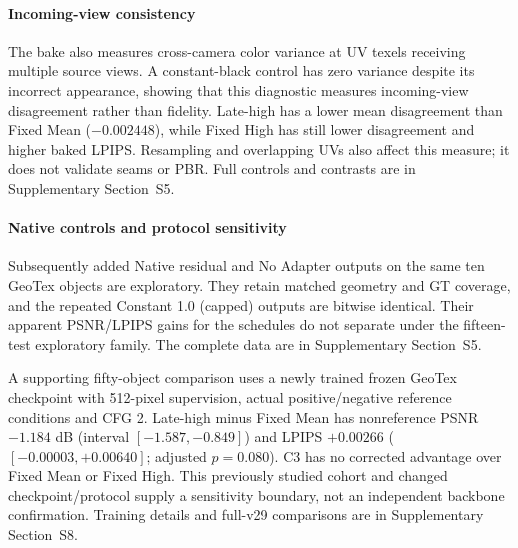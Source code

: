 \documentclass[times,twocolumn,final]{elsarticle}
\begin{document}
\paragraph{Incoming-view consistency}
The bake also measures cross-camera color variance at UV texels receiving multiple source views. A constant-black control has zero variance despite its incorrect appearance, showing that this diagnostic measures incoming-view disagreement rather than fidelity. Late-high has a lower mean disagreement than Fixed Mean ($-0.002448$), while Fixed High has still lower disagreement and higher baked LPIPS. Resampling and overlapping UVs also affect this measure; it does not validate seams or PBR. Full controls and contrasts are in Supplementary Section~S5.

\paragraph{Native controls and protocol sensitivity}
Subsequently added Native residual and No Adapter outputs on the same ten GeoTex objects are exploratory. They retain matched geometry and GT coverage, and the repeated Constant 1.0 (capped) outputs are bitwise identical. Their apparent PSNR/LPIPS gains for the schedules do not separate under the fifteen-test exploratory family. The complete data are in Supplementary Section~S5.

A supporting fifty-object comparison uses a newly trained frozen GeoTex checkpoint with 512-pixel supervision, actual positive/negative reference conditions and CFG 2. Late-high minus Fixed Mean has nonreference PSNR $-1.184$ dB (interval $[-1.587,-0.849]$) and LPIPS $+0.00266$ ($[-0.00003,+0.00640]$; adjusted $p=0.080$). C3 has no corrected advantage over Fixed Mean or Fixed High. This previously studied cohort and changed checkpoint/protocol supply a sensitivity boundary, not an independent backbone confirmation. Training details and full-v29 comparisons are in Supplementary Section~S8.
\end{document}
